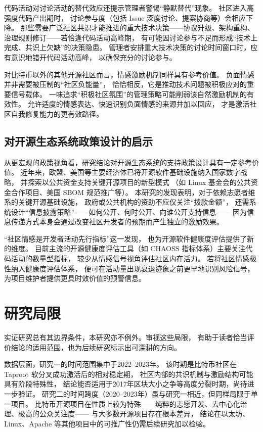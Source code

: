 代码活动对讨论活动的替代效应还提示管理者警惕“静默替代”现象。
社区进入高强度代码产出期时，
讨论参与度（包括 Issue 深度讨论、提案协商等）会相应下降。
那些需要广泛社区共识才能推进的重大技术决策——协议升级、架构重构、
治理规则修订——若恰逢代码活动高峰期，
有可能因讨论参与不足而形成“技术上完成、共识上欠缺”的决策隐患。
管理者安排重大技术决策的讨论时间窗口时，应有意识地错开代码活动高峰，
以确保充分的讨论参与。

对比特币以外的其他开源社区而言，情感激励机制同样具有参考价值。
负面情感并非需要被压制的“社区负能量”，
恰恰相反，它是推动技术问题被积极应对的重要信号载体。
一味追求“积极社区氛围”的管理策略可能削弱该自然激励机制的有效性。
允许适度的情感表达、快速识别负面情感的来源并加以回应，
才是激活社区自我修复能力的更有效路径。

\subsection{对开源生态系统政策设计的启示}

从更宏观的政策视角看，研究结论对开源生态系统的支持政策设计具有一定参考价值。
近年来，欧盟、美国等主要经济体已将开源软件基础设施纳入国家数字战略，
并探索以公共资金支持关键开源项目的新型模式
（如 Linux 基金会的公共资金合作项目、美国 SBOM 规范推广等）。
本研究的发现表明，对于依赖志愿者维系的关键开源基础设施，
政府或公共机构的资助不应仅关注“拨款金额”，
还需系统设计“信息披露策略”——如何公开、何时公开、向谁公开支持信息——
因为信息传递方式本身会通过改变社区开发者的预期而产生独立的激励效果。

“社区情感是开发者活动先行指标”这一发现，
也为开源软件健康度评估提供了新的维度。
目前主流的开源健康度评估工具（如 CHAOSS 指标体系）主要关注代码活动的数量型指标，
较少从情感信号视角评估社区内在活力。
若将社区情感极性纳入健康度评估体系，
便可在活动量出现衰退迹象之前更早地识别风险信号，
为项目维护者提供更具时效价值的预警信息。


\section{研究局限}

实证研究总有其边界条件，本研究亦不例外。审视这些局限，
有助于读者恰当评价结论的适用范围，也为后续研究标示出可深耕的方向。

数据层面，研究一的时间范围集中于2022--2023年。
该时期是比特币社区在 Taproot 软分叉成功激活后的相对稳定期，
社区内部的共识机制与激励结构可能具有阶段特殊性，
结论能否适用于2017年区块大小之争等高度分裂时期，尚待进一步验证。
研究二的时间跨度（2020--2023年）虽与研究一相近，但同样局限于单一项目。
比特币开源项目在性质上较为特殊——纯粹的志愿开发、去中心化治理、极高的公众关注度——
与大多数开源项目存在根本差异，
结论在以太坊、Linux、Apache 等其他项目中的可推广性仍需后续研究加以检验。

